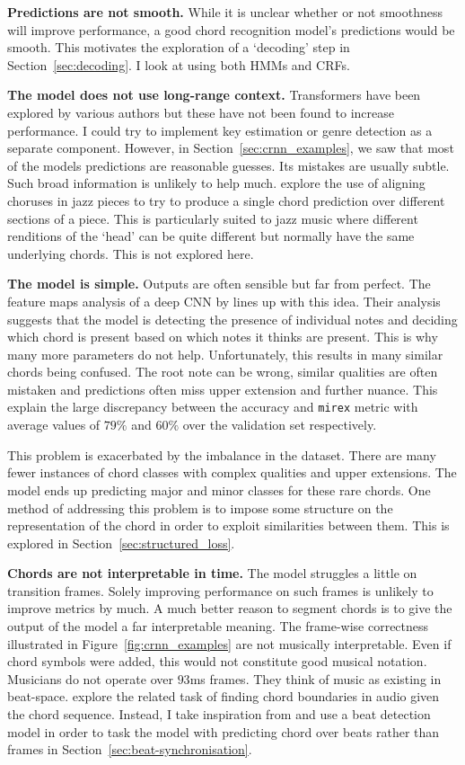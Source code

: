\textbf{Predictions are not smooth.} While it is unclear whether or not smoothness will improve performance, a good chord recognition model's predictions would be smooth. This motivates the exploration of a `decoding' step in Section~\ref{sec:decoding}. I look at using both HMMs and CRFs.

\textbf{The model does not use long-range context.} Transformers have been explored by various authors but these have not been found to increase performance. I could try to implement key estimation or genre detection as a separate component. However, in Section~\ref{sec:crnn_examples}, we saw that most of the models predictions are reasonable guesses. Its mistakes are usually subtle. Such broad information is unlikely to help much. \citet{ChorusAlignmentJAAH} explore the use of aligning choruses in jazz pieces to try to produce a single chord prediction over different sections of a piece. This is particularly suited to jazz music where different renditions of the `head' can be quite different but normally have the same underlying chords. This is not explored here. 

\textbf{The model is simple.} Outputs are often sensible but far from perfect. The feature maps analysis of a deep CNN by \citet{FeatureMaps} lines up with this idea. Their analysis suggests that the model is detecting the presence of individual notes and deciding which chord is present based on which notes it thinks are present. This is why many more parameters do not help. Unfortunately, this results in many similar chords being confused. The root note can be wrong, similar qualities are often mistaken and predictions often miss upper extension and further nuance. This explain the large discrepancy between the accuracy and \texttt{mirex} metric with average values of $79\%$ and $60\%$ over the validation set respectively. 

This problem is exacerbated by the imbalance in the dataset. There are many fewer instances of chord classes with complex qualities and upper extensions. The model ends up predicting major and minor classes for these rare chords. One method of addressing this problem is to impose some structure on the representation of the chord in order to exploit similarities between them. This is explored in Section~\ref{sec:structured_loss}.

\textbf{Chords are not interpretable in time.} The model struggles a little on transition frames. Solely improving performance on such frames is unlikely to improve metrics by much. A much better reason to segment chords is to give the output of the model a far interpretable meaning. The frame-wise correctness illustrated in Figure~\ref{fig:crnn_examples} are not musically interpretable. Even if chord symbols were added, this would not constitute good musical notation. Musicians do not operate over $93$ms frames. They think of music as existing in beat-space. \citet{AlignmentChordAnnotations} explore the related task of finding chord boundaries in audio given the chord sequence. Instead, I take inspiration from \citet{MelodyTranscriptionViaGenerativePreTraining} and use a beat detection model in order to task the model with predicting chord over beats rather than frames in Section~\ref{sec:beat-synchronisation}. 
